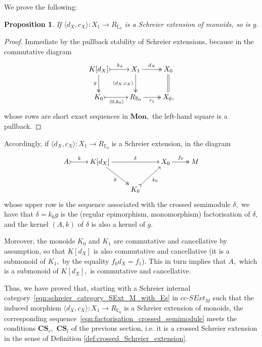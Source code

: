 \documentclass[a4paper]{amsart}
\theoremstyle{plain}
\newtheorem{proposition}[subsection]{Proposition}
\theoremstyle{definition}
\theoremstyle{remark}
\newcommand{\la}{\langle}
\newcommand{\ra}{\rangle}
\begin{document}
We prove the following:
\begin{proposition}
\label{prop:g_is_Schreier}
If $\la d_X,c_X\ra\colon X_1\rightarrow R_{\mathbb{E}_0}$ is a Schreier extension of monoids, so is $g.$
\end{proposition}
\begin{proof}
Immediate by the pullback stability of Schreier extensions, because in the commutative diagram
\begin{equation*}
\xymatrix{
{K[d_X]} \ar@{>>}[d]_-g \ar@{>->}[r]^-{k_d} &{X_1} \ar@{>>}[d]_-{\la d_X,c_X\ra} \ar@{->>}[r]^-{d_X} &{X_0} \ar@{=}[d] \\
{K_0} \ar@{>->}[r]_-{\la0,k_0\ra} &{R_{\mathbb{E}_0}} \ar@{->>}[r]_{r_1} &{X_0,}
}
\end{equation*}
whose rows are short exact sequences in $\mathbf{Mon},$ the left-hand square is a pullback.
\end{proof}
Accordingly, if $\la d_X,c_X\ra\colon X_1\rightarrow R_{\mathbb{E}_0}$ is a Schreier extension, in the diagram
\begin{equation}
\begin{aligned}
\label{eqn:factorisation_crossed_semimodule}
\xymatrix{
{A} \ar@{>->}[r]^-{k} &{K[d_X]} \ar[rr]^-{\delta} \ar@{->>}[rd]_-g &\ &{X_0} \ar@{->>}[r]^-{f_0} &{M} \\
&\ &{K_0} \ar@{>->}[ru]_-{k_0} &\ &\
}
\end{aligned}
\end{equation}
whose upper row is the sequence associated with the crossed semimodule $\delta,$ we have that $\delta=k_0g$ is the (regular epimorphism, monomorphism) factorisation of $\delta,$ and the kernel $(A,k)$ of $\delta$ is also a kernel of $g.$

Moreover, the monoids $K_0$ and $K_1$ are commutative and cancellative by assumption, so that $K[d_X]$ is also commutative and cancellative (it is a submonoid of $K_1,$ by the equality $f_0d_X=f_1$). This in turn implies that $A,$ which is a submonoid of $K[d_X],$ is commutative and cancellative.

Thus, we have proved that, starting with a Schreier internal category~\eqref{eqn:schreier_category_SExt_M_with_Es} in $cc\text{-}SExt_M$ such that the induced morphism $\la d_X,c_X\ra\colon X_1\rightarrow R_{\mathbb{E}_0}$ is a Schreier extension of monoids, the corresponding sequence~\eqref{eqn:factorisation_crossed_semimodule} meets the conditions $\mathbf{CS}_r,$ $\mathbf{CS}_l$ of the previous section, i.e. it is a crossed Schreier extension in the sense of Definition \ref{def:crossed_Schreier_extension}.
\end{document}
